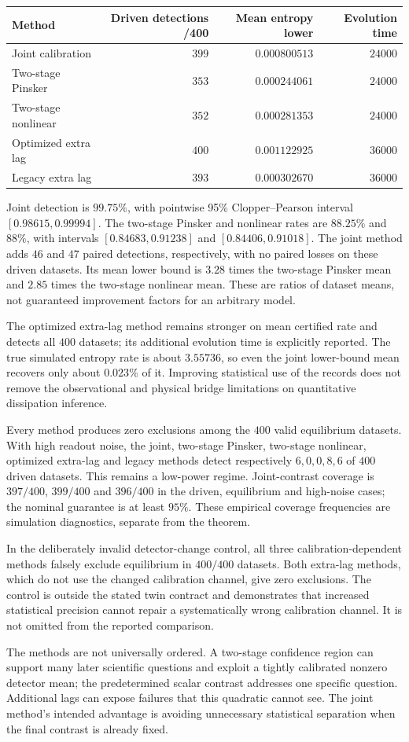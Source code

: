 \begin{center}
\begin{tabular}{l|r|r|r}
Method & Driven detections /400 & Mean entropy lower & Evolution time\\\hline
Joint calibration & $399$ & $0.000800513$ & $24000$\\
Two-stage Pinsker & $353$ & $0.000244061$ & $24000$\\
Two-stage nonlinear & $352$ & $0.000281353$ & $24000$\\
Optimized extra lag & $400$ & $0.001122925$ & $36000$\\
Legacy extra lag & $393$ & $0.000302670$ & $36000$
\end{tabular}
\end{center}

Joint detection is $99.75\%$, with pointwise 95\% Clopper--Pearson interval
$[0.98615,0.99994]$. The two-stage Pinsker and nonlinear rates are
$88.25\%$ and $88\%$, with intervals $[0.84683,0.91238]$ and
$[0.84406,0.91018]$. The joint method adds $46$ and $47$ paired detections,
respectively, with no paired losses on these driven datasets. Its mean lower
bound is $3.28$ times the two-stage Pinsker mean and $2.85$ times the
two-stage nonlinear mean. These are ratios of dataset means, not guaranteed
improvement factors for an arbitrary model.

The optimized extra-lag method remains stronger on mean certified rate and
detects all $400$ datasets; its additional evolution time is explicitly
reported. The true simulated entropy rate is about $3.55736$, so even the
joint lower-bound mean recovers only about $0.023\%$ of it. Improving
statistical use of the records does not remove the observational and physical
bridge limitations on quantitative dissipation inference.

Every method produces zero exclusions among the $400$ valid equilibrium
datasets. With high readout noise, the joint, two-stage Pinsker, two-stage
nonlinear, optimized extra-lag and legacy methods detect respectively
$6,0,0,8,6$ of $400$ driven datasets. This remains a low-power regime.
Joint-contrast coverage is $397/400$, $399/400$ and $396/400$ in the driven,
equilibrium and high-noise cases; the nominal guarantee is at least $95\%$.
These empirical coverage frequencies are simulation diagnostics, separate
from the theorem.

In the deliberately invalid detector-change control, all three
calibration-dependent methods falsely exclude equilibrium in $400/400$
datasets. Both extra-lag methods, which do not use the changed calibration
channel, give zero exclusions. The control is outside the stated twin
contract and demonstrates that increased statistical precision cannot repair
a systematically wrong calibration channel. It is not omitted from the
reported comparison.

The methods are not universally ordered. A two-stage confidence region can
support many later scientific questions and exploit a tightly calibrated
nonzero detector mean; the predetermined scalar contrast addresses one
specific question. Additional lags can expose failures that this quadratic
cannot see. The joint method's intended advantage is avoiding unnecessary
statistical separation when the final contrast is already fixed.
